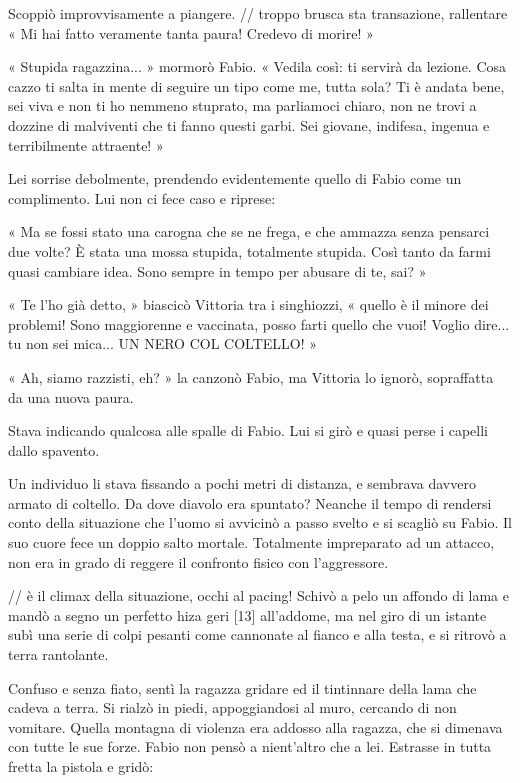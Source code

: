 Scoppiò improvvisamente a piangere.
// troppo brusca sta transazione, rallentare
« Mi hai fatto veramente tanta paura! Credevo di morire! »

« Stupida ragazzina... » mormorò Fabio. « Vedila così: ti servirà da lezione. Cosa cazzo ti salta in mente di seguire un tipo come me, tutta sola? Ti è andata bene, sei viva e non ti ho nemmeno stuprato, ma parliamoci chiaro, non ne trovi a dozzine di malviventi che ti fanno questi garbi. Sei giovane, indifesa, ingenua e terribilmente attraente! »

Lei sorrise debolmente, prendendo evidentemente quello di Fabio come un complimento. Lui non ci fece caso e riprese:

« Ma se fossi stato una carogna che se ne frega, e che ammazza senza pensarci due volte? È stata una mossa stupida, totalmente stupida. Così tanto da farmi quasi cambiare idea. Sono sempre in tempo per abusare di te, sai? »

« Te l'ho già detto, » biascicò Vittoria tra i singhiozzi, « quello è il minore dei problemi! Sono maggiorenne e vaccinata, posso farti quello che vuoi! Voglio dire... tu non sei mica... UN NERO COL COLTELLO! »

« Ah, siamo razzisti, eh? » la canzonò Fabio, ma Vittoria lo ignorò, sopraffatta da una nuova paura.

Stava indicando qualcosa alle spalle di Fabio. Lui si girò e quasi perse i capelli dallo spavento.

Un individuo li stava fissando a pochi metri di distanza, e sembrava davvero armato di coltello. Da dove diavolo era spuntato? Neanche il tempo di rendersi conto della situazione che l'uomo si avvicinò a passo svelto e si scagliò su Fabio. Il suo cuore fece un doppio salto mortale. Totalmente impreparato ad un attacco, non era in grado di reggere il confronto fisico con l'aggressore.

// è il climax della situazione, occhi al pacing!
Schivò a pelo un affondo di lama e mandò a segno un perfetto hiza geri [13] all'addome, ma nel giro di un istante subì una serie di colpi pesanti come cannonate al fianco e alla testa, e si ritrovò a terra rantolante.

Confuso e senza fiato, sentì la ragazza gridare ed il tintinnare della lama che cadeva a terra. Si rialzò in piedi, appoggiandosi al muro, cercando di non vomitare. Quella montagna di violenza era addosso alla ragazza, che si dimenava con tutte le sue forze. Fabio non pensò a nient'altro che a lei. Estrasse in tutta fretta la pistola e gridò:

